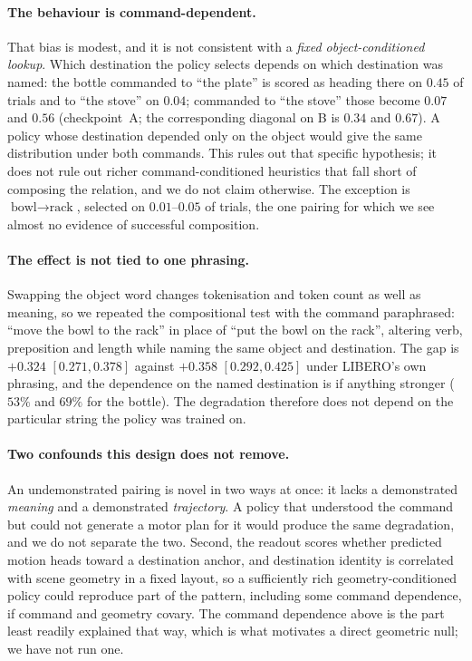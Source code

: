 \documentclass{article}
\begin{document}
\paragraph{The behaviour is command-dependent.} That bias is modest, and it is not consistent
with a \emph{fixed object-conditioned lookup}. Which destination the policy selects depends on
which destination was named: the bottle commanded to ``the plate'' is scored as heading there
on $0.45$ of trials and to ``the stove'' on $0.04$; commanded to ``the stove'' those become
$0.07$ and $0.56$ (checkpoint~A; the corresponding diagonal on B is $0.34$ and $0.67$). A
policy whose destination depended only on the object would give the same distribution under
both commands. This rules out that specific hypothesis; it does not rule out richer
command-conditioned heuristics that fall short of composing the relation, and we do not claim
otherwise. The exception is $\textrm{bowl} \to \textrm{rack}$, selected on $0.01$--$0.05$ of
trials, the one pairing for which we see almost no evidence of successful composition.

\paragraph{The effect is not tied to one phrasing.} Swapping the object word changes
tokenisation and token count as well as meaning, so we repeated the compositional test with the
command paraphrased: ``move the bowl to the rack'' in place of ``put the bowl on the rack'',
altering verb, preposition and length while naming the same object and destination. The gap is
$+0.324$ $[0.271, 0.378]$ against $+0.358$ $[0.292, 0.425]$ under LIBERO's own phrasing, and the
dependence on the named destination is if anything stronger ($53\%$ and $69\%$ for the bottle).
The degradation therefore does not depend on the particular string the policy was trained on.

\paragraph{Two confounds this design does not remove.} An undemonstrated pairing is novel in
two ways at once: it lacks a demonstrated \emph{meaning} and a demonstrated \emph{trajectory}.
A policy that understood the command but could not generate a motor plan for it would produce
the same degradation, and we do not separate the two. Second, the readout scores whether
predicted motion heads toward a destination anchor, and destination identity is correlated with
scene geometry in a fixed layout, so a sufficiently rich geometry-conditioned policy could
reproduce part of the pattern, including some command dependence, if command and geometry
covary. The command dependence above is the part least readily explained that way, which is
what motivates a direct geometric null; we have not run one.
\end{document}
